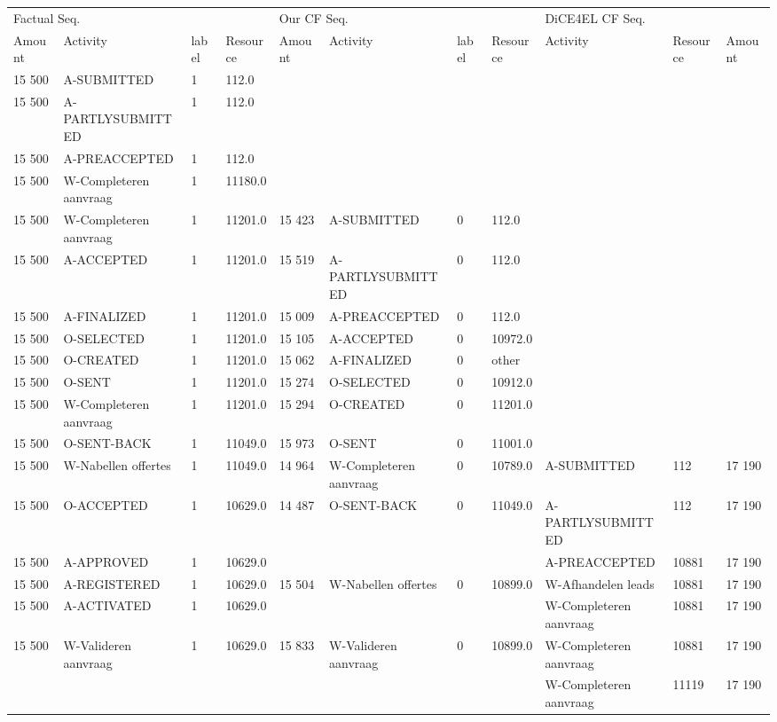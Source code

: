 \begin{tabular}{lllllllllll}
\toprule
\multicolumn{4}{l}{Factual Seq.} & \multicolumn{4}{l}{Our CF Seq.} & \multicolumn{3}{l}{DiCE4EL CF Seq.} \\
Amount & Activity & label & Resource & Amount & Activity & label & Resource & Activity & Resource & Amount \\
\midrule
15 500 & A-SUBMITTED & 1 & 112.0 &  &  &  &  &  &  &  \\
15 500 & A-PARTLYSUBMITTED & 1 & 112.0 &  &  &  &  &  &  &  \\
15 500 & A-PREACCEPTED & 1 & 112.0 &  &  &  &  &  &  &  \\
15 500 & W-Completeren aanvraag & 1 & 11180.0 &  &  &  &  &  &  &  \\
15 500 & W-Completeren aanvraag & 1 & 11201.0 & 15 423 & A-SUBMITTED & 0 & 112.0 &  &  &  \\
15 500 & A-ACCEPTED & 1 & 11201.0 & 15 519 & A-PARTLYSUBMITTED & 0 & 112.0 &  &  &  \\
15 500 & A-FINALIZED & 1 & 11201.0 & 15 009 & A-PREACCEPTED & 0 & 112.0 &  &  &  \\
15 500 & O-SELECTED & 1 & 11201.0 & 15 105 & A-ACCEPTED & 0 & 10972.0 &  &  &  \\
15 500 & O-CREATED & 1 & 11201.0 & 15 062 & A-FINALIZED & 0 & other &  &  &  \\
15 500 & O-SENT & 1 & 11201.0 & 15 274 & O-SELECTED & 0 & 10912.0 &  &  &  \\
15 500 & W-Completeren aanvraag & 1 & 11201.0 & 15 294 & O-CREATED & 0 & 11201.0 &  &  &  \\
15 500 & O-SENT-BACK & 1 & 11049.0 & 15 973 & O-SENT & 0 & 11001.0 &  &  &  \\
15 500 & W-Nabellen offertes & 1 & 11049.0 & 14 964 & W-Completeren aanvraag & 0 & 10789.0 & A-SUBMITTED & 112 & 17 190 \\
15 500 & O-ACCEPTED & 1 & 10629.0 & 14 487 & O-SENT-BACK & 0 & 11049.0 & A-PARTLYSUBMITTED & 112 & 17 190 \\
15 500 & A-APPROVED & 1 & 10629.0 &  &  &  &  & A-PREACCEPTED & 10881 & 17 190 \\
15 500 & A-REGISTERED & 1 & 10629.0 & 15 504 & W-Nabellen offertes & 0 & 10899.0 & W-Afhandelen leads & 10881 & 17 190 \\
15 500 & A-ACTIVATED & 1 & 10629.0 &  &  &  &  & W-Completeren aanvraag & 10881 & 17 190 \\
15 500 & W-Valideren aanvraag & 1 & 10629.0 & 15 833 & W-Valideren aanvraag & 0 & 10899.0 & W-Completeren aanvraag & 10881 & 17 190 \\
 &  &  &  &  &  &  &  & W-Completeren aanvraag & 11119 & 17 190 \\
\bottomrule
\end{tabular}
